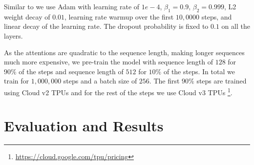 \documentclass[10pt, a4paper]{article}
\begin{document}
Similar to \cite{devlin2019bert} we use Adam with learning rate of $1e-4$, $\beta_1=0.9$, $\beta_2=0.999$, L2 weight decay of $0.01$, learning rate warmup over the first $10,0000$ steps, and linear decay of the learning rate. The dropout probability is fixed to $0.1$ on all the layers.

As the attentions are quadratic to the sequence length, making longer sequences much more expensive, we pre-train the model with sequence length of $128$ for $90\%$ of the steps and sequence length of $512$ for $10\%$ of the steps. In total we train for $1,000,000$ steps and a batch size of $256$. The first $90\%$ steps are trained using Cloud v2 TPUs and for the rest of the steps we use Cloud v3 TPUs \footnote{\scriptsize{\url{https://cloud.google.com/tpu/pricing}}}.


\section{Evaluation and Results}\label{sec:eval-results}



\end{document}
